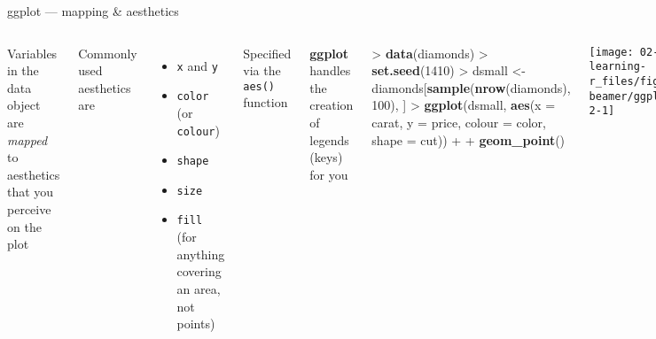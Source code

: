 \documentclass[10pt,ignorenonframetext,compress, aspectratio=169]{beamer}
\newenvironment{Shaded}{\begin{snugshade}}{\end{snugshade}}
\newcommand{\KeywordTok}[1]{\textcolor[rgb]{0.13,0.29,0.53}{\textbf{{#1}}}}
\newcommand{\DataTypeTok}[1]{\textcolor[rgb]{0.13,0.29,0.53}{{#1}}}
\newcommand{\DecValTok}[1]{\textcolor[rgb]{0.00,0.00,0.81}{{#1}}}
\newcommand{\StringTok}[1]{\textcolor[rgb]{0.31,0.60,0.02}{{#1}}}
\newcommand{\NormalTok}[1]{{#1}}
\providecommand{\tightlist}{%
  \setlength{\itemsep}{0pt}\setlength{\parskip}{0pt}}
\newcommand{\columnsbegin}{\begin{columns}}
\newcommand{\columnsend}{\end{columns}}
\begin{document}
\begin{frame}[fragile]{ggplot --- mapping \& aesthetics}

\columnsbegin
{}

Variables in the data object are \emph{mapped} to aesthetics that you
perceive on the plot

Commonly used aesthetics are

\begin{itemize}
\tightlist
\item
  \texttt{x} and \texttt{y}
\item
  \texttt{color} (or \texttt{colour})
\item
  \texttt{shape}
\item
  \texttt{size}
\item
  \texttt{fill} (for anything covering an area, not points)
\end{itemize}

Specified via the \texttt{aes()} function

\textbf{ggplot} handles the creation of legends (keys) for you


\begin{Shaded}
\begin{Highlighting}[]
\NormalTok{>}\StringTok{ }\KeywordTok{data}\NormalTok{(diamonds)}
\NormalTok{>}\StringTok{ }\KeywordTok{set.seed}\NormalTok{(}\DecValTok{1410}\NormalTok{)}
\NormalTok{>}\StringTok{ }\NormalTok{dsmall <-}\StringTok{ }\NormalTok{diamonds[}\KeywordTok{sample}\NormalTok{(}\KeywordTok{nrow}\NormalTok{(diamonds), }\DecValTok{100}\NormalTok{), ]}
\NormalTok{>}\StringTok{ }\KeywordTok{ggplot}\NormalTok{(dsmall, }\KeywordTok{aes}\NormalTok{(}\DataTypeTok{x =} \NormalTok{carat, }\DataTypeTok{y =} \NormalTok{price, }\DataTypeTok{colour =} \NormalTok{color, }\DataTypeTok{shape =} \NormalTok{cut)) +}
\NormalTok{+}\StringTok{     }\KeywordTok{geom_point}\NormalTok{()}
\end{Highlighting}
\end{Shaded}

\begin{center}\texttt{[image: 02-learning-r\_files/figure-beamer/ggplot-2-1]} \end{center}

\columnsend

\end{frame}
\end{document}
